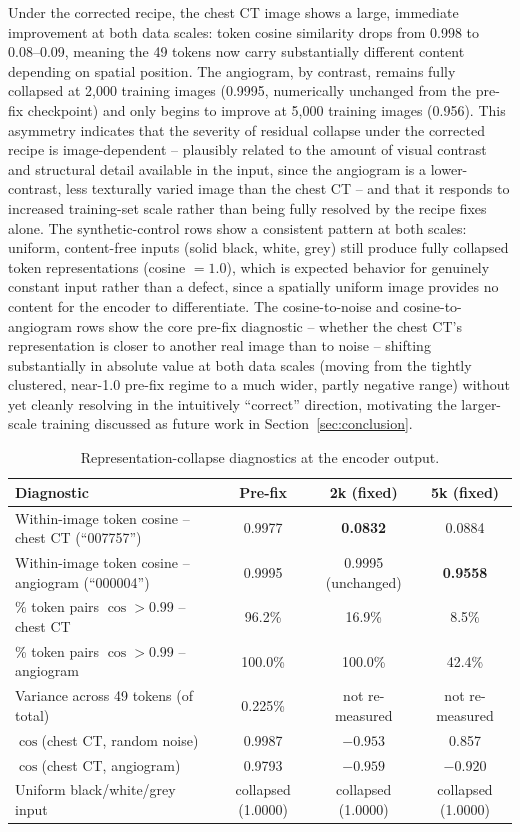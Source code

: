 \documentclass[conference]{IEEEtran}
\begin{document}
Under the corrected recipe, the chest CT image shows a large, immediate improvement at both data scales: token cosine similarity drops from 0.998 to 0.08--0.09, meaning the 49 tokens now carry substantially different content depending on spatial position. The angiogram, by contrast, remains fully collapsed at 2,000 training images (0.9995, numerically unchanged from the pre-fix checkpoint) and only begins to improve at 5,000 training images (0.956). This asymmetry indicates that the severity of residual collapse under the corrected recipe is image-dependent -- plausibly related to the amount of visual contrast and structural detail available in the input, since the angiogram is a lower-contrast, less texturally varied image than the chest CT -- and that it responds to increased training-set scale rather than being fully resolved by the recipe fixes alone. The synthetic-control rows show a consistent pattern at both scales: uniform, content-free inputs (solid black, white, grey) still produce fully collapsed token representations (cosine $=1.0$), which is expected behavior for genuinely constant input rather than a defect, since a spatially uniform image provides no content for the encoder to differentiate. The cosine-to-noise and cosine-to-angiogram rows show the core pre-fix diagnostic -- whether the chest CT's representation is closer to another real image than to noise -- shifting substantially in absolute value at both data scales (moving from the tightly clustered, near-1.0 pre-fix regime to a much wider, partly negative range) without yet cleanly resolving in the intuitively ``correct'' direction, motivating the larger-scale training discussed as future work in Section~\ref{sec:conclusion}.

\begin{table}[t]
\centering
\caption{Representation-collapse diagnostics at the encoder output.}
\label{tab:representation-collapse}
\small
\renewcommand{\arraystretch}{1.10}
\begin{tabular}{@{}p{}ccc@{}}
\toprule
\textbf{Diagnostic} & \textbf{Pre-fix} & \textbf{2k (fixed)} & \textbf{5k (fixed)} \\
\midrule
Within-image token cosine -- chest CT (``007757'') & 0.9977 & \textbf{0.0832} & 0.0884 \\
Within-image token cosine -- angiogram (``000004'') & 0.9995 & 0.9995 (unchanged) & \textbf{0.9558} \\
\% token pairs $\cos > 0.99$ -- chest CT & 96.2\% & 16.9\% & 8.5\% \\
\% token pairs $\cos > 0.99$ -- angiogram & 100.0\% & 100.0\% & 42.4\% \\
Variance across 49 tokens (of total) & 0.225\% & not re-measured & not re-measured \\
$\cos$(chest CT, random noise) & 0.9987 & $-0.953$ & 0.857 \\
$\cos$(chest CT, angiogram) & 0.9793 & $-0.959$ & $-0.920$ \\
Uniform black/white/grey input & collapsed (1.0000) & collapsed (1.0000) & collapsed (1.0000) \\
\bottomrule
\end{tabular}
\end{table}
\end{document}
